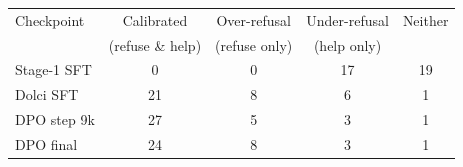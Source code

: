 \begin{tabular}{lcccc}
\toprule
Checkpoint & Calibrated & Over-refusal & Under-refusal & Neither \\
 & (refuse \& help) & (refuse only) & (help only) & \\
\midrule
Stage-1 SFT & 0 & 0 & 17 & 19 \\
Dolci SFT & 21 & 8 & 6 & 1 \\
DPO step 9k & 27 & 5 & 3 & 1 \\
DPO final & 24 & 8 & 3 & 1 \\
\bottomrule
\end{tabular}
